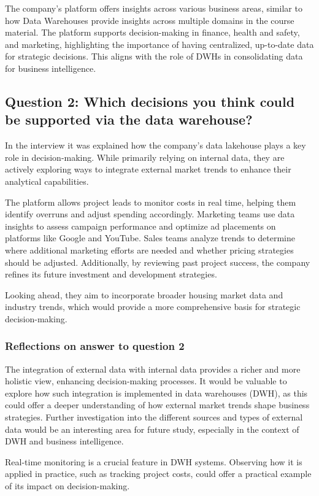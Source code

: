 The company's platform offers insights across various business areas, similar to how Data Warehouses provide insights across multiple domains in the course material. 
The platform supports decision-making in finance, health and safety, and marketing, highlighting the importance of having centralized, up-to-date data for strategic decisions. 
This aligns with the role of DWHs in consolidating data for business intelligence.

\subsection{Question 2: Which decisions you think could be supported via the data warehouse?}

In the interview it was explained how the company's data lakehouse plays a key role in decision-making. While primarily relying on 
internal data, they are actively exploring ways to integrate external market trends to enhance their analytical capabilities.

The platform allows project leads to monitor costs in real time, helping them identify overruns and adjust spending accordingly. 
Marketing teams use data insights to assess campaign performance and optimize ad placements on platforms like Google and YouTube. 
Sales teams analyze trends to determine where additional marketing efforts are needed and whether pricing strategies should be adjusted. 
Additionally, by reviewing past project success, the company refines its future investment and development strategies.

Looking ahead, they aim to incorporate broader housing market data and industry trends, which would provide a more comprehensive basis 
for strategic decision-making.
\subsubsection{Reflections on answer to question 2}

The integration of external data with internal data provides a richer and more holistic view, enhancing decision-making processes. 
It would be valuable to explore how such integration is implemented in data warehouses (DWH), as this could offer a deeper understanding 
of how external market trends shape business strategies. Further investigation into the different sources and types of external data 
would be an interesting area for future study, especially in the context of DWH and business intelligence.

Real-time monitoring is a crucial feature in DWH systems. Observing how it is applied in practice, such as tracking project costs, 
could offer a practical example of its impact on decision-making.

